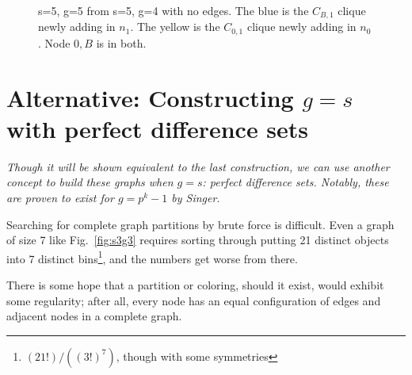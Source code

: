 \documentclass[11pt, oneside]{article} 	%
\begin{document}
\begin{figure}[!htb]
\centering
{}
\caption{s=5, g=5 from s=5, g=4 with no edges. The blue is the $C_{B,1}$ clique newly adding in $n_1$. The yellow is the $C_{0,1}$ clique newly adding in $n_0$. Node $0,B$ is in both.}
\label{fig:s5g5}
\end{figure}



\section{Alternative: Constructing $g=s$ with perfect difference sets}
\emph{Though it will be shown equivalent to the last construction, we can use another concept to build these graphs when $g=s$: perfect difference sets. Notably, these are proven to exist for $g=p^k-1$ by Singer\cite{1}}.

Searching for complete graph partitions by brute force is difficult. Even a graph of size 7 like Fig.~\ref{fig:s3g3} requires sorting through putting 21 distinct objects into 7 distinct bins\footnote{$(21!)/((3!)^7)$, though with some symmetries}, and the numbers get worse from there. 

There is some hope that a partition or coloring, should it exist, would exhibit some regularity; after all, every node has an equal configuration of edges and adjacent nodes in a complete graph.
\end{document}
